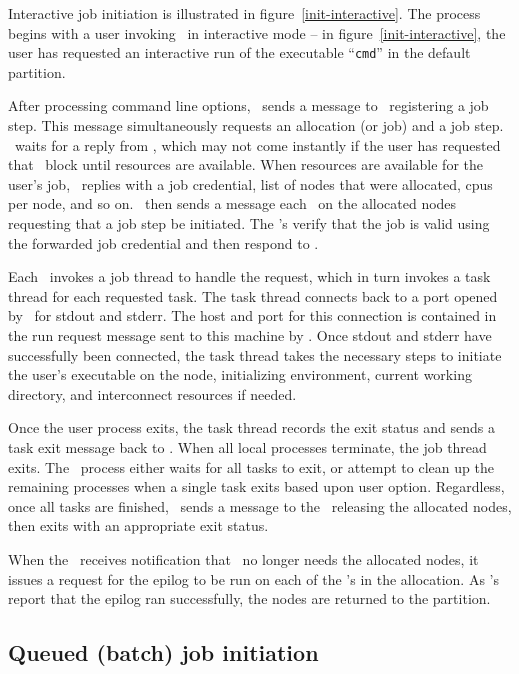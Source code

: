 Interactive job initiation is illustrated in figure~\ref{init-interactive}.
The process begins with a user invoking \srun\ in interactive mode -- in 
figure~\ref{init-interactive}, the user has requested an interactive
run of the executable ``{\tt cmd}'' in the default partition. 

After processing command line options, \srun\ sends a message to
\slurmctld\ registering a job step. This message simultaneously requests
an allocation (or job) and a job step. \srun\ waits for a reply from
\slurmctld , which may not come instantly if the user has requested that
\srun\ block until resources are available. When resources are available
for the user's job, \slurmctld\ replies with a job credential, list of
nodes that were allocated, cpus per node, and so on. \srun\ then sends
a message each \slurmd\ on the allocated nodes requesting that a job
step be initiated. The \slurmd 's verify that the job is valid using
the forwarded job credential and then respond to \srun .

Each \slurmd\ invokes a job thread to handle the request, which in turn
invokes a task thread for each requested task. The task thread connects
back to a port opened by \srun\ for stdout and stderr. The host and
port for this connection is contained in the run request message sent
to this machine by \srun . Once stdout and stderr have successfully 
been connected, the task thread takes the necessary steps to initiate 
the user's executable on the node, initializing environment, current
working directory, and interconnect resources if needed. 

Once the user process exits, the task thread records the exit status and
sends a task exit message back to \srun . When all local processes
terminate, the job thread exits. The \srun\ process either waits
for all tasks to exit, or attempt to clean up the remaining processes
when a single task exits based upon user option. Regardless, once all
tasks are finished, \srun\ sends a message to the \slurmctld\ releasing
the allocated nodes, then exits with an appropriate exit status.

When the \slurmctld\ receives notification that \srun\ no longer needs
the allocated nodes, it issues a request for the epilog to be run on each of
the \slurmd 's in the allocation. As \slurmd 's report that the epilog ran
successfully, the nodes are returned to the partition.

\subsection{Queued (batch) job initiation}

